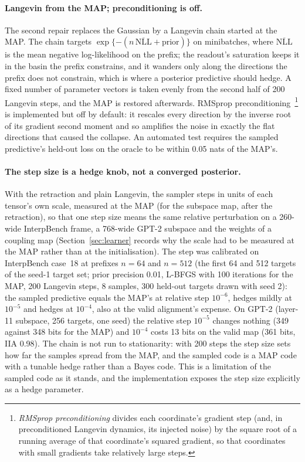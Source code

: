 \documentclass[11pt,a4paper]{article}
\begin{document}
\paragraph{Langevin from the MAP; preconditioning is off.} The second repair replaces the Gaussian by a Langevin chain started at the MAP. The chain targets $\exp\{-(n\,\overline{\mathrm{NLL}}+\text{prior})\}$ on minibatches, where $\overline{\mathrm{NLL}}$ is the mean negative log-likelihood on the prefix; the readout's saturation keeps it in the basin the prefix constrains, and it wanders only along the directions the prefix does not constrain, which is where a posterior predictive should hedge. A fixed number of parameter vectors is taken evenly from the second half of 200 Langevin steps, and the MAP is restored afterwards. RMSprop preconditioning~\cite{li2016psgld}\footnote{\emph{RMSprop preconditioning} divides each coordinate's gradient step (and, in preconditioned Langevin dynamics, its injected noise) by the square root of a running average of that coordinate's squared gradient, so that coordinates with small gradients take relatively large steps.} is implemented but off by default: it rescales every direction by the inverse root of its gradient second moment and so amplifies the noise in exactly the flat directions that caused the collapse. An automated test requires the sampled predictive's held-out loss on the oracle to be within 0.05 nats of the MAP's.

\paragraph{The step size is a hedge knob, not a converged posterior.} With the retraction and plain Langevin, the sampler steps in units of each tensor's own scale, measured at the MAP (for the subspace map, after the retraction), so that one step size means the same relative perturbation on a 260-wide InterpBench frame, a 768-wide GPT-2 subspace and the weights of a coupling map (Section~\ref{sec:learner} records why the scale had to be measured at the MAP rather than at the initialisation). The step was calibrated on InterpBench case~18 at prefixes $n=64$ and $n=512$ (the first 64 and 512 targets of the seed-1 target set; prior precision 0.01, L-BFGS with 100 iterations for the MAP, 200 Langevin steps, 8 samples, 300 held-out targets drawn with seed 2): the sampled predictive equals the MAP's at relative step $10^{-6}$, hedges mildly at $10^{-5}$ and hedges at $10^{-4}$, also at the valid alignment's expense. On GPT-2 (layer-11 subspace, 256 targets, one seed) the relative step $10^{-5}$ changes nothing (349 against 348 bits for the MAP) and $10^{-4}$ costs 13 bits on the valid map (361 bits, IIA 0.98). The chain is not run to stationarity: with 200 steps the step size sets how far the samples spread from the MAP, and the sampled code is a MAP code with a tunable hedge rather than a Bayes code. This is a limitation of the sampled code as it stands, and the implementation exposes the step size explicitly as a hedge parameter.
\end{document}
